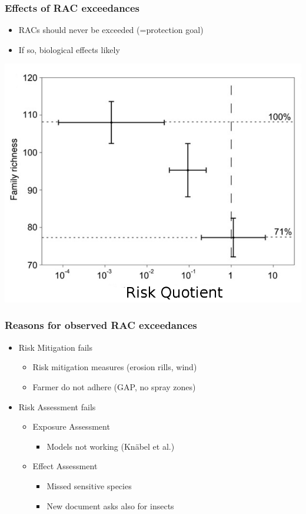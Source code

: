 \documentclass[
	12pt
	]{beamer}
\begin{document}
{%
\begin{frame}
\frametitle{Effects of RAC exceedances}
			\begin{itemize}
				\item RACs should never be exceeded (=protection goal)
				\item If so, biological effects likely
			\end{itemize}
	    	    	\includegraphics[height=0.7\textheight]{figs/stehle_pnas_2015_mod.png}
\end{frame}
}



\begin{frame}
\frametitle{Reasons for observed RAC exceedances}
	\begin{itemize}
		\item Risk Mitigation fails
			\begin{itemize}
				\item Risk mitigation measures (erosion rills, wind)
				\item Farmer do not adhere (GAP, no spray zones)
			\end{itemize}
		\item Risk Assessment fails
			\begin{itemize}
				\item Exposure Assessment
					\begin{itemize}
						\item Models not working (Knäbel et al.)
					\end{itemize}
				\item Effect Assessment
					\begin{itemize}
						\item Missed sensitive species
						\item New document asks also for insects
					\end{itemize}
			\end{itemize}

	\end{itemize}
\end{frame}
\end{document}

